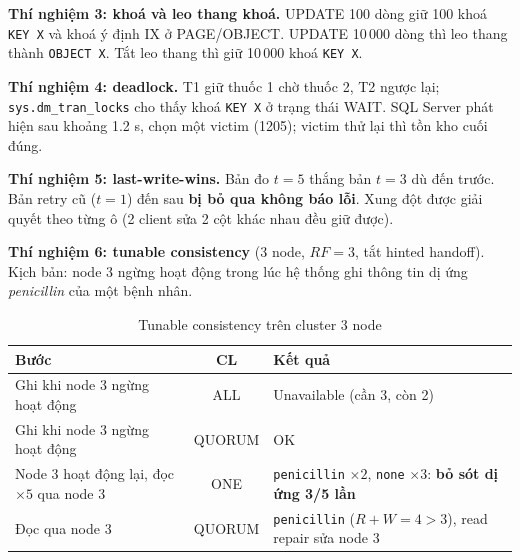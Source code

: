 \textbf{Thí nghiệm 3: khoá và leo thang khoá.} UPDATE 100 dòng giữ 100 khoá \texttt{KEY X} và khoá ý định IX ở PAGE/OBJECT. UPDATE 10\,000 dòng thì leo thang thành \texttt{OBJECT X}. Tắt leo thang thì giữ 10\,000 khoá \texttt{KEY X}.

\textbf{Thí nghiệm 4: deadlock.} T1 giữ thuốc 1 chờ thuốc 2, T2 ngược lại; \texttt{sys.dm\_tran\_locks} cho thấy khoá \texttt{KEY X} ở trạng thái WAIT. SQL Server phát hiện sau khoảng 1.2 s, chọn một victim (1205); victim thử lại thì tồn kho cuối đúng.

\textbf{Thí nghiệm 5: last-write-wins.} Bản đo $t=5$ thắng bản $t=3$ dù đến trước. Bản retry cũ ($t=1$) đến sau \textbf{bị bỏ qua không báo lỗi}. Xung đột được giải quyết theo từng ô (2 client sửa 2 cột khác nhau đều giữ được).

\textbf{Thí nghiệm 6: tunable consistency} (3 node, $RF = 3$, tắt hinted handoff). Kịch bản: node 3 ngừng hoạt động trong lúc hệ thống ghi thông tin dị ứng \textit{penicillin} của một bệnh nhân.

\begin{table}[H]
\centering
\caption{Tunable consistency trên cluster 3 node}
\label{tab:consistency}
\begin{tabularx}{\linewidth}{|X|c|X|}
\hline
\textbf{Bước} & \textbf{CL} & \textbf{Kết quả} \\ \hline
Ghi khi node 3 ngừng hoạt động & ALL & Unavailable (cần 3, còn 2) \\ \hline
Ghi khi node 3 ngừng hoạt động & QUORUM & OK \\ \hline
Node 3 hoạt động lại, đọc $\times 5$ qua node 3 & ONE & \texttt{penicillin} $\times 2$, \texttt{none} $\times 3$: \textbf{bỏ sót dị ứng 3/5 lần} \\ \hline
Đọc qua node 3 & QUORUM & \texttt{penicillin} ($R + W = 4 > 3$), read repair sửa node 3 \\ \hline
\end{tabularx}
\end{table}

